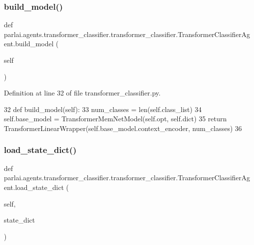 \subsubsection{\texorpdfstring{build\+\_\+model()}{build\_model()}}
{\footnotesize\ttfamily def parlai.\+agents.\+transformer\+\_\+classifier.\+transformer\+\_\+classifier.\+Transformer\+Classifier\+Agent.\+build\+\_\+model (\begin{DoxyParamCaption}\item[{}]{self }\end{DoxyParamCaption})}



Definition at line 32 of file transformer\+\_\+classifier.\+py.


\begin{DoxyCode}
32     \textcolor{keyword}{def }build\_model(self):
33         num\_classes = len(self.class\_list)
34         self.base\_model = TransformerMemNetModel(self.opt, self.dict)
35         \textcolor{keywordflow}{return} TransformerLinearWrapper(self.base\_model.context\_encoder, num\_classes)
36 
\end{DoxyCode}
\mbox{\label{classparlai_1_1agents_1_1transformer__classifier_1_1transformer__classifier_1_1TransformerClassifierAgent_a2799356b935d49c3fa522f07428ff1c3}} 
\subsubsection{\texorpdfstring{load\+\_\+state\+\_\+dict()}{load\_state\_dict()}}
{\footnotesize\ttfamily def parlai.\+agents.\+transformer\+\_\+classifier.\+transformer\+\_\+classifier.\+Transformer\+Classifier\+Agent.\+load\+\_\+state\+\_\+dict (\begin{DoxyParamCaption}\item[{}]{self,  }\item[{}]{state\+\_\+dict }\end{DoxyParamCaption})}

